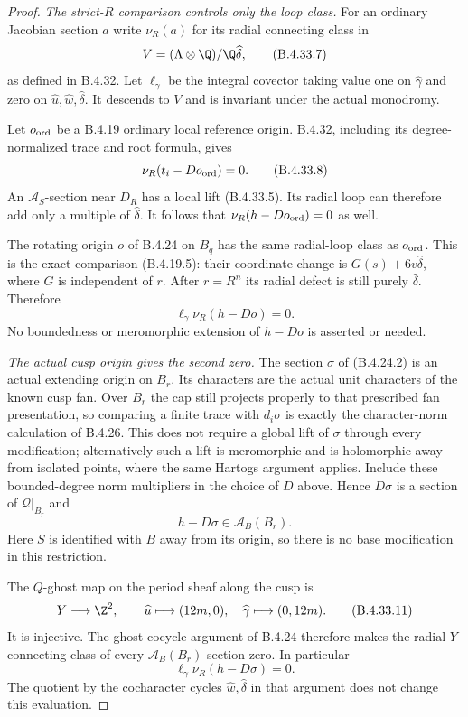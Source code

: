 \begin{proof}
\emph{The strict-$R$ comparison controls only the loop class.}
For an ordinary Jacobian section $a$
write $\nu_R(a)$ for its radial connecting
class in
\[
 V=(\Lambda\otimes\Q)/\Q\widehat\delta,
 \tag{B.4.33.7}
\]
as defined in B.4.32. Let $\ell_\gamma$
be the integral covector taking value one
on $\widehat\gamma$ and zero on
$\widehat u,\widehat w,\widehat\delta$.
It descends to $V$ and is invariant under
the actual monodromy.

Let $o_{\rm ord}$ be a B.4.19 ordinary
local reference origin. B.4.32, including
its degree-normalized trace and root
formula, gives
\[
 \nu_R(t_i-D o_{\rm ord})=0.
 \tag{B.4.33.8}
\]
An $\mathcal A_S$-section near $D_R$
has a local lift (B.4.33.5). Its radial
loop can therefore add only a multiple
of $\widehat\delta$. It follows that
$\nu_R(h-D o_{\rm ord})=0$ as well.

The rotating origin $o$ of B.4.24 on
$B_q$ has the same radial-loop class
as $o_{\rm ord}$. This is the exact
comparison (B.4.19.5): their coordinate
change is $G(s)+6v\widehat\delta$,
where $G$ is independent of $r$.
After $r=R^n$ its radial defect is still
purely $\widehat\delta$. Therefore
\[
 \ell_\gamma\nu_R(h-D o)=0.
 \tag{B.4.33.9}
\]
No boundedness or meromorphic extension
of $h-D o$ is asserted or needed.

\emph{The actual cusp origin gives the second zero.}
The section $\sigma$ of (B.4.24.2)
is an actual extending origin on $B_r$.
Its characters are the actual unit
characters of the known cusp fan.
Over $B_r$ the cap still projects properly
to that prescribed fan presentation,
so comparing a finite trace with
$d_i\sigma$ is exactly the character-norm
calculation of B.4.26. This does not
require a global lift of $\sigma$
through every modification; alternatively
such a lift is meromorphic and is
holomorphic away from isolated points,
where the same Hartogs argument applies.
Include these bounded-degree norm
multipliers in the choice of $D$ above.
Hence $D\sigma$ is a
section of $\mathcal Q|_{B_r}$ and
\[
                  h-D\sigma\in
                         \mathcal A_B(B_r).
 \tag{B.4.33.10}
\]
Here $S$ is identified with $B$ away
from its origin, so there is no base
modification in this restriction.

The $Q$-ghost map on the period sheaf
along the cusp is
\[
 Y\longrightarrow\Z^2,\qquad
 \widehat u\longmapsto(12m,0),\quad
 \widehat\gamma\longmapsto(0,12m).
 \tag{B.4.33.11}
\]
It is injective. The ghost-cocycle
argument of B.4.24 therefore makes the
radial $Y$-connecting class of every
$\mathcal A_B(B_r)$-section zero.
In particular
\[
             \ell_\gamma\nu_R(h-D\sigma)=0.
 \tag{B.4.33.12}
\]
The quotient by the cocharacter cycles
$\widehat w,\widehat\delta$ in that
argument does not change this evaluation.


\end{proof}
